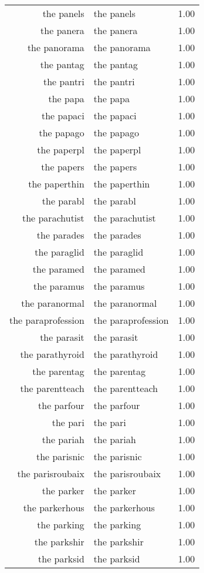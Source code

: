 \begin{table}[ht]
\begin{tabular}{rlr}
  the panels & the panels & 1.00 \\ 
  the panera & the panera & 1.00 \\ 
  the panorama & the panorama & 1.00 \\ 
  the pantag & the pantag & 1.00 \\ 
  the pantri & the pantri & 1.00 \\ 
  the papa & the papa & 1.00 \\ 
  the papaci & the papaci & 1.00 \\ 
  the papago & the papago & 1.00 \\ 
  the paperpl & the paperpl & 1.00 \\ 
  the papers & the papers & 1.00 \\ 
  the paperthin & the paperthin & 1.00 \\ 
  the parabl & the parabl & 1.00 \\ 
  the parachutist & the parachutist & 1.00 \\ 
  the parades & the parades & 1.00 \\ 
  the paraglid & the paraglid & 1.00 \\ 
  the paramed & the paramed & 1.00 \\ 
  the paramus & the paramus & 1.00 \\ 
  the paranormal & the paranormal & 1.00 \\ 
  the paraprofession & the paraprofession & 1.00 \\ 
  the parasit & the parasit & 1.00 \\ 
  the parathyroid & the parathyroid & 1.00 \\ 
  the parentag & the parentag & 1.00 \\ 
  the parentteach & the parentteach & 1.00 \\ 
  the parfour & the parfour & 1.00 \\ 
  the pari & the pari & 1.00 \\ 
  the pariah & the pariah & 1.00 \\ 
  the parisnic & the parisnic & 1.00 \\ 
  the parisroubaix & the parisroubaix & 1.00 \\ 
  the parker & the parker & 1.00 \\ 
  the parkerhous & the parkerhous & 1.00 \\ 
  the parking & the parking & 1.00 \\ 
  the parkshir & the parkshir & 1.00 \\ 
  the parksid & the parksid & 1.00 \\ 

\end{tabular}
\end{table}
